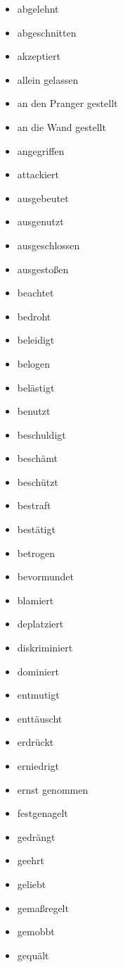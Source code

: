 \begin{multicols}{2}
  \begin{itemize}
    \item abgelehnt
    \item abgeschnitten
    \item akzeptiert
    \item allein gelassen
    \item an den Pranger gestellt
    \item an die Wand gestellt
    \item angegriffen
    \item attackiert
    \item ausgebeutet
    \item ausgenutzt
    \item ausgeschlossen
    \item ausgestoßen
    \item beachtet
    \item bedroht
    \item beleidigt
    \item belogen
    \item belästigt
    \item benutzt
    \item beschuldigt
    \item beschämt
    \item beschützt
    \item bestraft
    \item bestätigt
    \item betrogen
    \item bevormundet
    \item blamiert
    \item deplatziert
    \item diskriminiert
    \item dominiert
    \item entmutigt
    \item enttäuscht
    \item erdrückt
    \item erniedrigt
    \item ernst genommen
    \item festgenagelt
    \item gedrängt
    \item geehrt
    \item geliebt
    \item gemaßregelt
    \item gemobbt
    \item gequält

\end{itemize}
\end{multicols}
